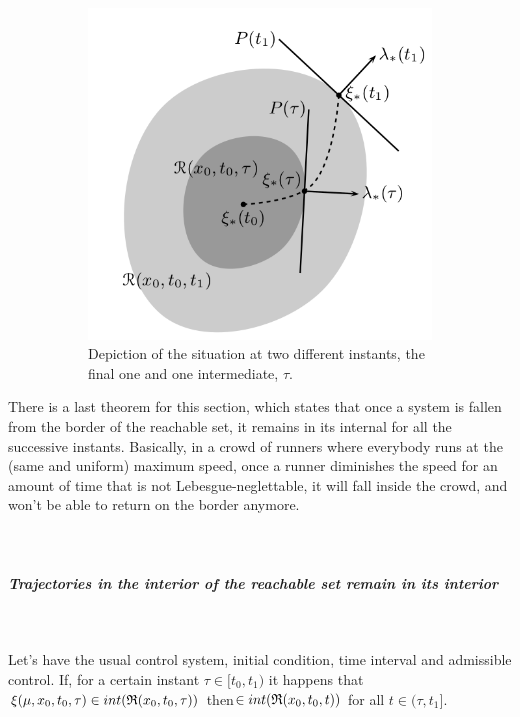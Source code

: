 \begin{figure}[h]
\begin{subfigure}[b]{0.25\linewidth}
	\end{subfigure}	
	\begin{subfigure}[b]{0.25\linewidth}
		\includegraphics[width=\linewidth]{imgs/5-3-R.png}
		\caption{Depiction of the situation at two different instants, the final one and one intermediate, $\tau$.}
	\end{subfigure}	
	\caption{\mbox{}}
	\label{fig-5.3}
\end{figure}

There is a last theorem for this section, which states that once a system is fallen from the border of the reachable set, it remains in its internal for all the successive instants. Basically, in a crowd of runners where everybody runs at the (same and uniform) maximum speed, once a runner diminishes the speed for an amount of time that is not Lebesgue-neglettable, it will fall inside the crowd, and won't be able to return on the border anymore. 
\\\\\\
\subparagraph[5.17]{Trajectories in the interior of the reachable set remain in its interior}\mbox{}\\
\begin{teo}
	Let's have the usual control system, initial condition, time interval and admissible control. If, for a certain instant $\tau\in[t_0,t_1)$ it happens that $\xi(\mu,x_0,t_0,\tau)\in int(\mathfrak{R}(x_0,t_0,\tau))$ then$\in int(\mathfrak{R}(x_0,t_0,t))$ for all $t\in(\tau,t_1]$.
	\label{5-17}
	\label{T11}
\end{teo}

